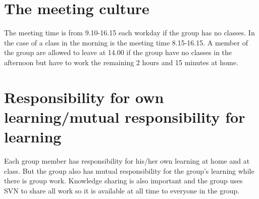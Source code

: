 \section{The meeting culture}
The meeting time is from 9.10-16.15 each workday if the group has no classes. In the case of a class in the morning is the meeting time 8.15-16.15.
A member of the group are allowed to leave at 14.00 if the group have no classes in the afternoon but have to work the remaining 2 hours and 15 minutes at home.
\section{Responsibility for own learning/mutual responsibility for learning}
Each group member has responsibility for his/her own learning at home and at class. But the group also has mutual responsibility for the group's learning while there is group work. 
Knowledge sharing is also important and the group uses SVN to share all work so it is available at all time to everyone in the group.